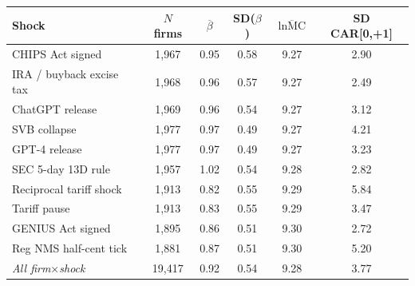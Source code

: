 \begin{tabular}{lccccc}
\toprule
Shock & $N$ firms & $\overline{\beta}$ & SD($\beta$) & $\overline{\ln\text{MC}}$ & SD CAR[0,+1] \\
\midrule
CHIPS Act signed & 1,967 & 0.95 & 0.58 & 9.27 & 2.90 \\
IRA / buyback excise tax & 1,968 & 0.96 & 0.57 & 9.27 & 2.49 \\
ChatGPT release & 1,969 & 0.96 & 0.54 & 9.27 & 3.12 \\
SVB collapse & 1,977 & 0.97 & 0.49 & 9.27 & 4.21 \\
GPT-4 release & 1,977 & 0.97 & 0.49 & 9.27 & 3.23 \\
SEC 5-day 13D rule & 1,957 & 1.02 & 0.54 & 9.28 & 2.82 \\
Reciprocal tariff shock & 1,913 & 0.82 & 0.55 & 9.29 & 5.84 \\
Tariff pause & 1,913 & 0.83 & 0.55 & 9.29 & 3.47 \\
GENIUS Act signed & 1,895 & 0.86 & 0.51 & 9.30 & 2.72 \\
Reg NMS half-cent tick & 1,881 & 0.87 & 0.51 & 9.30 & 5.20 \\
\midrule \emph{All firm}$\times$\emph{shock} & 19,417 & 0.92 & 0.54 & 9.28 & 3.77 \\
\bottomrule
\end{tabular}